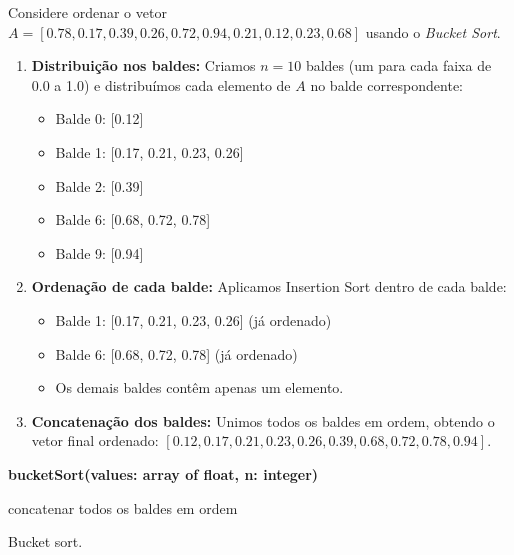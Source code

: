 \begin{exmp}
Considere ordenar o vetor $A = [0.78, 0.17, 0.39, 0.26, 0.72, 0.94, 0.21, 0.12, 0.23, 0.68]$ usando o \textit{Bucket Sort}.  

\begin{enumerate}
    \item \textbf{Distribuição nos baldes:}  
    Criamos $n = 10$ baldes (um para cada faixa de 0.0 a 1.0) e distribuímos cada elemento de $A$ no balde correspondente:  
    \begin{itemize}
        \item Balde 0: [0.12]  
        \item Balde 1: [0.17, 0.21, 0.23, 0.26]  
        \item Balde 2: [0.39]  
        \item Balde 6: [0.68, 0.72, 0.78]  
        \item Balde 9: [0.94]
    \end{itemize}

    \item \textbf{Ordenação de cada balde:}  
    Aplicamos Insertion Sort dentro de cada balde:
    \begin{itemize}
        \item Balde 1: [0.17, 0.21, 0.23, 0.26] (já ordenado)  
        \item Balde 6: [0.68, 0.72, 0.78] (já ordenado)  
        \item Os demais baldes contêm apenas um elemento.
    \end{itemize}

    \item \textbf{Concatenação dos baldes:}  
    Unimos todos os baldes em ordem, obtendo o vetor final ordenado:  
    $[0.12, 0.17, 0.21, 0.23, 0.26, 0.39, 0.68, 0.72, 0.78, 0.94]$.
\end{enumerate}
\end{exmp}

\begin{center}
\begin{minipage}{.9\linewidth}
\begin{algorithm}[H]
\DontPrintSemicolon
\textbf{bucketSort(values: array of float, n: integer)}

concatenar todos os baldes em ordem\;

\caption{Bucket sort.}
\label{lab:alg-bucketSort}
\end{algorithm}
\end{minipage}
\end{center}

